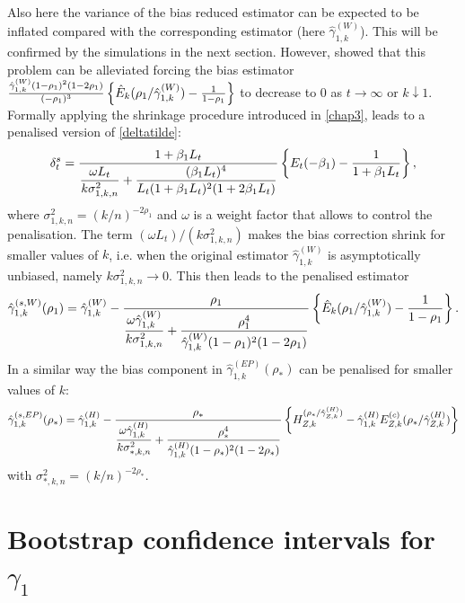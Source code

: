 \vspace{0.3cm}
Also here the variance of the bias reduced estimator can be expected to be inflated compared with the corresponding estimator (here $\hat{\gamma}_{1,k}^{(W)}$).
This will be confirmed by the simulations in the next section.
However, \cite{beirlant2017using} showed that this problem can be alleviated forcing the bias estimator ${\hat{\gamma}_{1,k}^{(W)} (1-\rho_1)^2(1-2\rho_1)\over (-\rho_1)^3}
\left\{\hat{E}_k (\rho_1/\hat{\gamma}_{1,k}^{(W)})-{1 \over 1-\rho_1} \right\}$ to decrease to 0 as $t \to \infty$ or $k \downarrow 1$. Formally applying the shrinkage procedure introduced in \autoref{chap3}, leads to a penalised version of \eqref{deltatilde}:
\[
\delta_t^s = {1+\beta_1 L_t \over \dfrac{\omega L_t}{k\sigma^2_{1,k,n}} +\dfrac{(\beta_1 L_t)^4}{L_t (1+\beta_1 L_t)^2(1+2\beta_1 L_t)}} \left\{ E_t(-\beta_1)-{1 \over 1+\beta_1 L_t} \right\},
\]
where $\sigma^2_{1,k,n}= (k/n)^{-2\rho_1}$ and $\omega$ is a weight factor that allows to control the penalisation. The term $(\omega L_t)/(k\sigma^2_{1,k,n})$ makes the bias correction shrink for smaller values of $k$, i.e. when the original estimator $\hat{\gamma}_{1,k}^{(W)}$ is asymptotically unbiased, namely 
$k\sigma^2_{1,k,n} \to 0$. This then leads to the penalised estimator
\begin{equation}
\hat{\gamma}_{1,k}^{(s,W)}(\rho_1) = \hat{\gamma}_{1,k}^{(W)}
- {\rho_1 \over \dfrac{\omega \hat{\gamma}_{1,k}^{(W)} }{k\sigma^2_{1,k,n}} +\dfrac{\rho_1^4}{\hat{\gamma}_{1,k}^{(W)} (1-\rho_1)^2(1-2\rho_1)} }
\left\{\hat{E}_k (\rho_1/\hat{\gamma}_{1,k}^{(W)})-{1 \over 1-\rho_1} \right\}.
\label{pW}
\end{equation}
In a similar way the bias component in $\hat{\gamma}_{1,k}^{(EP)}(\rho_*)$ can be penalised for smaller values of $k$:
\begin{equation}
\hat{\gamma}_{1,k}^{(s,EP)}(\rho_*) =
\hat{\gamma}_{1,k}^{(H)}- 
{\rho_* \over \dfrac{\omega \hat{\gamma}_{1,k}^{(H)} }{k\sigma^2_{*,k,n}} +\dfrac{\rho_*^4}{\hat{\gamma}_{1,k}^{(H)} (1-\rho_*)^2(1-2\rho_*)} }
\left\{
H_{Z,k}^{(\rho_*/ \hat{\gamma}_{Z,k}^{(H)})}-\hat{\gamma}_{1,k}^{(H)}E_{Z,k}^{(c)}(\rho_*/ \hat{\gamma}_{Z,k}^{(H)})
 \right\}
\label{pEP}
\end{equation}
with $\sigma^2_{*,k,n}=(k/n)^{-2\rho_*}$.

\section{Bootstrap confidence intervals for $\gamma_1$}\label{chap4::SecB}

